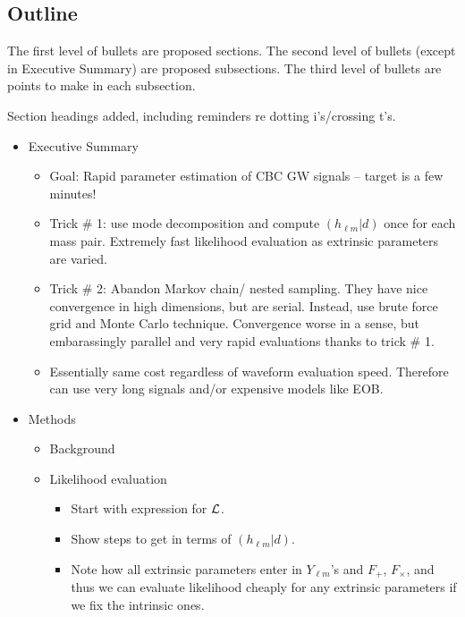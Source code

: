 \documentclass[twocolumn,prd,nofootinbib]{revtex4}
\newcommand\ForInternalReference[1]{#1}
\begin{document}
\ForInternalReference{
\begin{widetext}
\section*{Outline}
The first level of bullets are proposed sections. 
The second level of bullets (except in Executive Summary) are proposed subsections.
The third level of bullets are points to make in each subsection.

Section headings added, including reminders re dotting i's/crossing t's.

\begin{itemize}
\item Executive Summary
	\begin{itemize}
	\item Goal: Rapid parameter estimation of CBC GW signals -- target is a few minutes!
	\item Trick \# 1: use mode decomposition and compute $( h_{\ell m} | d )$ once for each mass pair.
		Extremely fast likelihood evaluation as extrinsic parameters are varied.
	\item Trick \# 2: Abandon Markov chain/ nested sampling. They have nice convergence in high dimensions,
		but are serial. Instead, use brute force grid and Monte Carlo technique. Convergence worse in a sense,
		but embarassingly parallel and very rapid evaluations thanks to trick \# 1.
	\item Essentially same cost regardless of waveform evaluation speed. Therefore can use very long signals 
		and/or expensive models like EOB. 
	\end{itemize}

\item Methods
	\begin{itemize}
        \item Background
           
	\item Likelihood evaluation
		\begin{itemize}
		\item Start with expression for ${\cal L}$. 
		\item Show steps to get in terms of $( h_{\ell m} | d )$.
		\item Note how all extrinsic parameters enter in $Y_{\ell m}$'s and $F_+$, $F_\times$, and thus we can
			evaluate likelihood cheaply for any extrinsic parameters if we fix the intrinsic ones.
		\end{itemize}
		

\end{itemize}
\end{itemize}
\end{widetext}}
\end{document}
